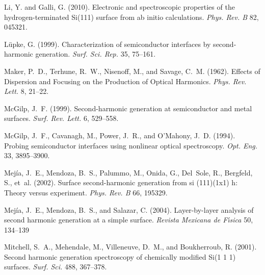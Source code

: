 \documentclass[utf8]{frontiersSCNS}
\begin{document}
\begin{thebibliography}{39}
Li, Y. and Galli, G. (2010).
\newblock Electronic and spectroscopic properties of the hydrogen-terminated
  {Si}(111) surface from ab initio calculations.
\newblock \emph{Phys. Rev. B} 82, 045321.
\newblock {}

L{\"u}pke, G. (1999).
\newblock Characterization of semiconductor interfaces by second-harmonic
  generation.
\newblock \emph{Surf. Sci. Rep.} 35, 75--161.
\newblock {}

Maker, P.~D., Terhune, R.~W., Nisenoff, M., and Savage, C.~M. (1962).
\newblock Effects of {Dispersion} and {Focusing} on the {Production} of
  {Optical} {Harmonics}.
\newblock \emph{Phys. Rev. Lett.} 8, 21--22.
\newblock {}

McGilp, J.~F. (1999).
\newblock Second-harmonic generation at semiconductor and metal surfaces.
\newblock \emph{Surf. Rev. Lett.} 6, 529--558.
\newblock {}

McGilp, J.~F., Cavanagh, M., Power, J.~R., and O'Mahony, J.~D. (1994).
\newblock Probing semiconductor interfaces using nonlinear optical
  spectroscopy.
\newblock \emph{Opt. Eng.} 33, 3895--3900.
\newblock {}

Mej{\'i}a, J.~E., Mendoza, B.~S., Palummo, M., Onida, G., Del~Sole, R.,
  Bergfeld, S., et~al. (2002).
\newblock Surface second-harmonic generation from si (111)(1x1) h: Theory
  versus experiment.
\newblock \emph{Phys. Rev. B} 66, 195329.
\newblock {}

Mej{\'i}a, J.~E., Mendoza, B.~S., and Salazar, C. (2004).
\newblock Layer-by-layer analysis of second harmonic generation at a simple
  surface.
\newblock \emph{Revista Mexicana de F\'{\i}sica} 50, 134--139

Mitchell, S.~A., Mehendale, M., Villeneuve, D.~M., and Boukherroub, R. (2001).
\newblock Second harmonic generation spectroscopy of chemically modified {Si}(1
  1 1) surfaces.
\newblock \emph{Surf. Sci.} 488, 367--378.
\newblock {}


\end{thebibliography}
\end{document}

